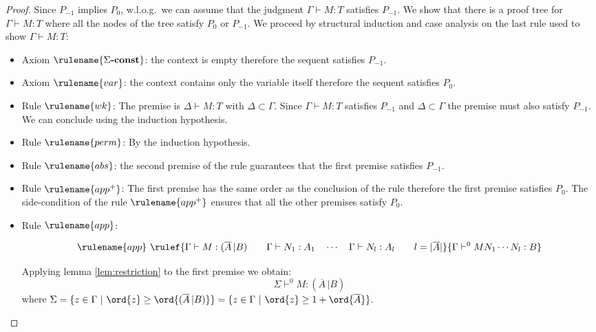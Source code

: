 \begin{proof}
Since $P_{-1}$ implies $P_0$, w.l.o.g.\ we can assume that the
judgment $\Gamma \vdash M : T$ satisfies $P_{-1}$. We show that
there is a proof tree for $\Gamma \vdash M : T$ where all the nodes
of the tree satisfy $P_0$ or $P_{-1}$. We proceed by structural
induction and case analysis on the last rule used to show $\Gamma
\vdash M : T$:
\begin{itemize}
\item Axiom $\rulename{\Sigma\mbox{\textbf{-const}}}$: the context is empty therefore the sequent satisfies $P_{-1}$.

\item Axiom $\rulename{var}$: the context contains only the variable itself therefore the sequent satisfies $P_0$.

\item Rule $\rulename{wk}$: The premise is $\Delta \vdash M : T$ with $\Delta \subset \Gamma$. Since
$\Gamma \vdash M : T$ satisfies $P_{-1}$ and $\Delta \subset \Gamma$ the premise must also satisfy $P_{-1}$. We can conclude using the
induction hypothesis.

\item Rule $\rulename{perm}$: By the induction hypothesis.


\item Rule $\rulename{abs}$: the second premise of the rule guarantees that the first
premise satisfies $P_{-1}$.

\item Rule $\rulename{app^+}$: The first premise has the same order as the
conclusion of the rule therefore the first premise satisfies
$P_0$. The side-condition of the rule $\rulename{app^+}$ ensures that all the other premises satisfy $P_0$.

\item Rule $\rulename{app}$:

$$ \rulename{app} \
    \rulef{
        { \Gamma \vdash M : (\overline{A} \, | B)
        \qquad
        \Gamma \vdash N_1 : A_1 \quad \cdots \quad \Gamma \vdash N_{l} : A_l \qquad l = |\overline{A}|
        }
    }
    {
        \Gamma \vdash^0 M N_1 \cdots N_{l} : B
    }
$$

Applying lemma \ref{lem:restriction} to the first premise we obtain:
\begin{equation}
 \Sigma \vdash^0 M : (\overline{A} \, | B) \label{eq:seq1}
\end{equation}
where $\Sigma = \{ z \in \Gamma \ | \ \ord{z} \geq \ord{(\overline{A} \, | B)} \} = \{ z \in \Gamma \ | \ \ord{z} \geq 1 + \ord{\overline{A}} \}.$


\end{itemize}
\end{proof}
